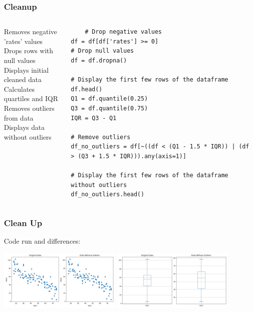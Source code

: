 \documentclass{beamer}
\newcounter{slidenum}
\begin{document}
\begin{frame}[fragile]
	\frametitle{Cleanup}
	\begin{columns}
Removes negative 'rates' values\\
\vspace{.2cm}
Drops rows with null values\\
\vspace{.2cm}
Displays initial cleaned data\\
\vspace{.2cm}
Calculates quartiles and IQR\\
\vspace{.2cm}
Removes outliers from data\\
Displays data without outliers
	\begin{lstlisting}
	# Drop negative values
df = df[df['rates'] >= 0]
# Drop null values
df = df.dropna()

# Display the first few rows of the dataframe
df.head()
Q1 = df.quantile(0.25)
Q3 = df.quantile(0.75)
IQR = Q3 - Q1

# Remove outliers
df_no_outliers = df[~((df < (Q1 - 1.5 * IQR)) | (df > (Q3 + 1.5 * IQR))).any(axis=1)]

# Display the first few rows of the dataframe without outliers
df_no_outliers.head()
	\end{lstlisting}
\end{columns}
\end{frame}

\begin{frame}[fragile]
	\frametitle{Clean Up}
	Code run and differences:

	\includegraphics[height=3cm]{scatter_plots1.png}
	\includegraphics[height=3cm]{scatter_plots3.png}

	
\end{frame}
\end{document}
